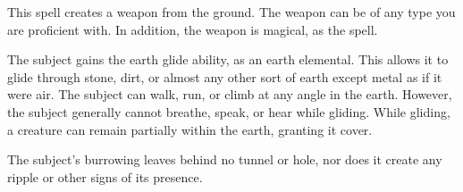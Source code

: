 \begin{spelleffect}
    This spell creates a weapon from the ground. The weapon can be of any type you are proficient with. In addition, the weapon is magical, as the  spell.
\end{spelleffect}

\spelldur{\durshort}
\begin{spelleffect}
  The subject gains the earth glide ability, as an earth elemental. This allows it to glide through stone, dirt, or almost any other sort of earth except metal  as if it were air. The subject can walk, run, or climb at any angle in the earth. However, the subject generally cannot breathe, speak, or hear while gliding. While gliding, a creature can remain partially within the earth, granting it cover.
\end{spelleffect}
\begin{spellnotes}
  The subject's burrowing leaves behind no tunnel or hole, nor does it create any ripple or other signs of its presence.
\end{spellnotes}

